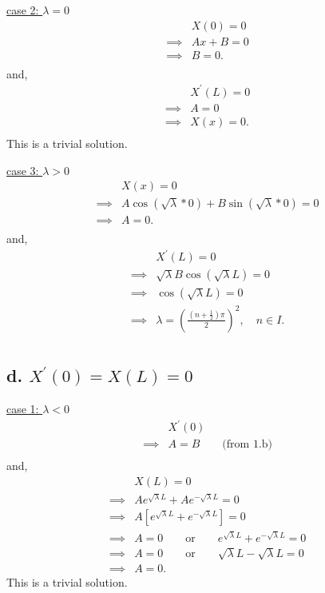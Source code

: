\documentclass{article}
\begin{document}
\noindent
\underline{case 2: $\lambda = 0$}
\begin{align*}
  &X(0) = 0 \\
  \implies& Ax + B = 0 \\
  \implies& B = 0. \\
\end{align*}
\newline
and,
\begin{align*}
  &X^{\prime}(L) = 0 \\
  \implies& A = 0 \\
  \implies& X(x) = 0. \\
\end{align*}
This is a trivial solution.
\newline

\noindent
\underline{case 3: $\lambda > 0$}
\begin{align*}
  &X(x) = 0 \\
  \implies&A \cos(\sqrt{\lambda} * 0) + 
  B \sin(\sqrt{\lambda} * 0) = 0 \\
  \implies& A = 0. \\
\end{align*}
and,
\begin{align*}
  &X^{\prime}(L) = 0 \\
  \implies& \sqrt{\lambda} B\cos(\sqrt{\lambda} L) = 0 \\
  \implies& \cos(\sqrt{\lambda} L) = 0 \\
  \implies& \lambda = (\frac{(n + \frac{1}{2}) \pi}{2})^2, \quad n \in I.\\
\end{align*}


\subsection*{d. \underline{$X^{\prime}(0) = X(L) = 0$}}
\underline{case 1: $\lambda < 0$}
\begin{align*}
  &X^{\prime}(0) \\
  \implies& A = B \qquad \text{(from 1.b)} \\
\end{align*}
and,
\begin{align*}
  &X(L) = 0 \\
  \implies& A e^{\sqrt{\lambda} L} + A e^{-\sqrt{\lambda} L}  = 0 \\
  \implies& A [e^{\sqrt{\lambda} L} + e^{-\sqrt{\lambda} L}] = 0 \\
  \implies& A = 0 \qquad \text{or} \qquad e^{\sqrt{\lambda} L} + e^{-\sqrt{\lambda} L} = 0 \\
  \implies& A = 0 \qquad \text{or} \qquad \sqrt{\lambda} L -\sqrt{\lambda} L = 0 \\
  \implies& A = 0.
\end{align*}
This is a trivial solution.
\newline
\end{document}
